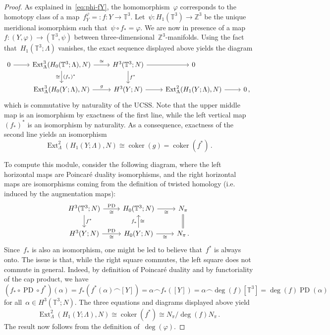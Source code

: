 \documentclass[10.9pt,a4paper]{amsart}
\theoremstyle{definition}
\theoremstyle{remark}
\newcommand{\Z}{\mathbb{Z}}
\newcommand{\bbT}{\mathbb{T}}
\newcommand{\PD}{\operatorname{PD}}
\newcommand{\coker}{\operatorname{coker}}
\newcommand{\Ext}{\operatorname{Ext}}
\begin{document}
\begin{proof}
As explained in~\eqref{eq:phi-fY}, the homomorphism~$\varphi$ corresponds to the homotopy class of a map~$f_{Y}^\varphi=:f\colon Y\to \bbT^3$.
Let~$\psi\colon H_1(\bbT^3)\to\Z^3$ be the unique meridional isomorphism such that~$\psi\circ f_*=\varphi$.
We are now in presence of a map~$f\colon (Y,\varphi)\to(\bbT^3,\psi)$ between three-dimensional~$\Z^3$-manifolds.
Using the fact that~$H_1(\bbT^3;\Lambda)$ vanishes, the exact sequence displayed above  yields the diagram
\[
\begin{tikzcd}
0\arrow[r]& \Ext^3_\Lambda(H_0(\bbT^3;\Lambda),N) \arrow[r,"\cong"] \arrow[d,"(f_*)^*","\cong"'] & H^{3}(\bbT^3;N)\arrow[d,"f^*"] \arrow[r]& 0 &\\
&\Ext^3_\Lambda(H_0(Y;\Lambda),N)\arrow[r,"g"] & H^3(Y;N)\arrow[r]&\Ext^2_\Lambda(H_1(Y;\Lambda),N)\arrow[r]&0\,,
\end{tikzcd}
\]
which is commutative by naturality of the UCSS.
Note that the upper middle map is an isomorphism by exactness of the first line, while the left vertical map~$(f_*)^*$
is an isomorphism by naturality.
As a consequence, exactness of the second line yields an isomorphism
\[
\Ext^2_\Lambda(H_1(Y;\Lambda),N)\cong\coker(g)=\coker(f^*)\,.
\]

To compute this module, consider the following diagram, where the left horizontal maps are Poincar\'e duality
isomorphisms, and the right horizontal maps are isomorphisms coming from the definition of twisted homology (i.e. induced by the augmentation maps):
\[
\begin{tikzcd}
H^3(\bbT^3;N) \arrow[r,"\PD","\cong"'] \arrow[d,"f^*"] & H_0(\bbT^3;N) \arrow[r,"\cong"'] & N_\pi\arrow[d,equal]\\
H^3(Y;N) \arrow[r,"\PD","\cong"'] & H_0(Y;N) \arrow[u,"f_*","\cong"']\arrow[r,"\cong"'] & N_\pi\,.
\end{tikzcd}
\]
Since~$f_*$ is also an isomorphism, one might be led to believe that~$f^*$ is always onto.
The issue is that, while the right square commutes, the left square
does not commute in general. Indeed, by definition of Poincar\'e duality and by functoriality of the cap product, we have
\[
(f_*\circ\PD\circ f^*)(\alpha)=f_*(f^*(\alpha)\frown [Y])=\alpha\frown f_*([Y])=\alpha\frown\deg(f)[\bbT^3]=\deg(f)\PD(\alpha)
\]
for all~$\alpha\in H^3(\bbT^3;N)$. The three equations and diagrams displayed above yield
\[
\Ext^2_\Lambda(H_1(Y;\Lambda),N)\cong\coker(f^*)\cong N_\pi/\deg(f) N_\pi\,.
\]
The result now follows from the definition of~$\deg(\varphi)$.
\end{proof}
\end{document}
